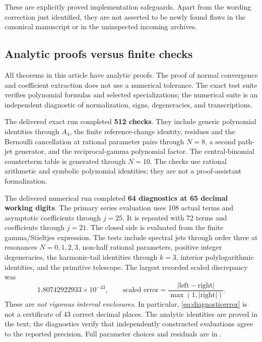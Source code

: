 These are explicitly proved implementation safeguards.  Apart from the
wording correction just identified, they are not asserted to be newly
found flaws in the canonical manuscript or in the uninspected incoming
archives.

\subsection{Analytic proofs versus finite checks}
All theorems in this article have analytic proofs.  The proof of normal
convergence and coefficient extraction does not use a numerical tolerance.
The exact test suite verifies polynomial formulas and selected
specializations; the numerical suite is an independent diagnostic of
normalization, signs, degeneracies, and transcriptions.

The delivered exact run completed \textbf{512 checks}.  They include generic
polynomial identities through $A_4$, the finite reference-change identity,
residues and the Bernoulli cancellation at rational parameter pairs through
$N=8$, a second path-jet generator, and the reciprocal-gamma polynomial
factor.  The central-binomial counterterm table is generated through
$N=10$.  The checks use rational arithmetic and symbolic polynomial
identities; they are not a proof-assistant formalization.

The delivered numerical run completed \textbf{64 diagnostics at 65 decimal
working digits}.  The primary series evaluation uses 108 actual terms
and asymptotic coefficients through $j=25$.  It is repeated with 72 terms
and coefficients through $j=21$.  The closed side is evaluated from the
finite gamma/Stieltjes expression.  The tests include spectral jets through
order three at resonances $N=0,1,2,3$, non-half rational parameters,
positive integer degeneracies, the harmonic-tail identities through
$k=3$, interior polylogarithmic identities, and the primitive telescope.
The largest recorded scaled discrepancy was
\begin{equation}\label{eq:diagnosticerror}
 1.80742922933\times10^{-43},\qquad
 \text{scaled error}=\frac{|\text{left}-\text{right}|}
 {\max(1,|\text{right}|)}.
\end{equation}
These are \emph{not rigorous interval enclosures}.  In particular,
\eqref{eq:diagnosticerror} is not a certificate of 43 correct decimal places.
The analytic identities are proved in the text; the diagnostics verify
that independently constructed evaluations agree to the reported precision.
Full parameter choices and residuals are in
.

